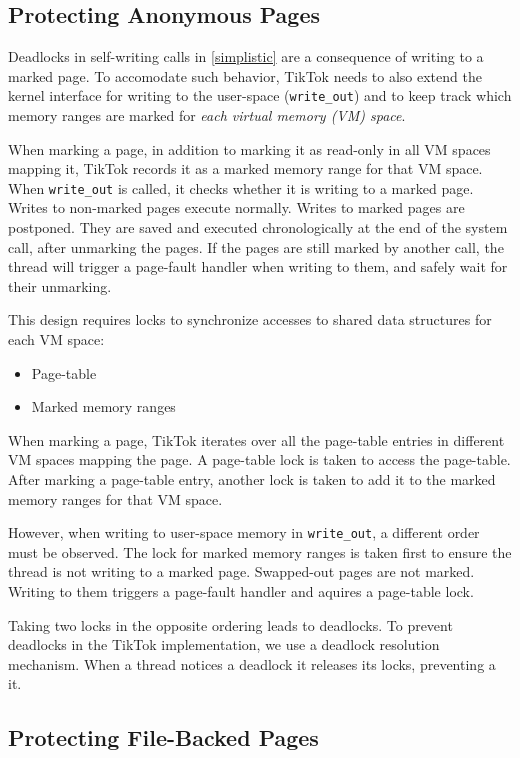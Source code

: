 \documentclass[conference]{IEEEtran}
\newcommand{\sysname}{TikTok}
\begin{document}
\subsection{Protecting Anonymous Pages}
\label{subsec:complex}

Deadlocks in self-writing calls in \autoref{simplistic} are a consequence of
writing to a marked page. To accomodate such behavior, \sysname{} needs to also
extend the kernel interface for writing to the user-space (\texttt{write\_out})
and to keep track which memory ranges are marked for \emph{each virtual memory
(VM) space}.

When marking a page, in addition to marking it as read-only in all VM spaces
mapping it, \sysname{} records it as a marked memory range for that VM space.
When \texttt{write\_out} is called, it checks whether it is writing to a marked
page. Writes to non-marked pages execute normally. Writes to marked pages are
postponed. They are saved and executed chronologically at the end of the system
call, after unmarking the pages. If the pages are still marked by another call,
the thread will trigger a page-fault handler when writing to them, and safely
wait for their unmarking.

This design requires locks to synchronize accesses to shared data structures for
each VM space:
\begin{itemize}
  \item Page-table
  \item Marked memory ranges
\end{itemize}

When marking a page, \sysname{} iterates over all the page-table entries in
different VM spaces mapping the page. A page-table lock is taken to access the
page-table. After marking a page-table entry, another lock is taken to add it to
the marked memory ranges for that VM space.

However, when writing to user-space memory in \texttt{write\_out}, a different
order must be observed. The lock for marked memory ranges is taken first to
ensure the thread is not writing to a marked page. Swapped-out pages are not
marked. Writing to them triggers a page-fault handler and aquires a page-table
lock.

Taking two locks in the opposite ordering leads to deadlocks. To prevent
deadlocks in the \sysname{} implementation, we use a deadlock resolution
mechanism. When a thread notices a deadlock it releases its locks, preventing a
it.

\subsection{Protecting File-Backed Pages}
\label{subsec:fileprot}
\end{document}
